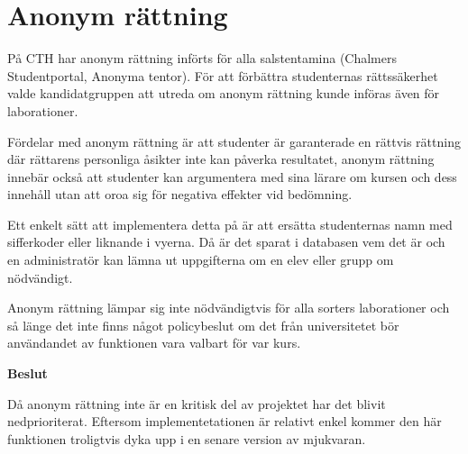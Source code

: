 \section{Anonym rättning}

På CTH har anonym rättning införts för alla salstentamina (Chalmers Studentportal, Anonyma tentor). För att förbättra studenternas rättssäkerhet valde kandidatgruppen att utreda om anonym rättning kunde införas även för laborationer.

Fördelar med anonym rättning är att studenter är garanterade en rättvis rättning där rättarens personliga åsikter inte kan påverka resultatet, anonym rättning innebär också att studenter kan argumentera med sina lärare om kursen och dess innehåll utan att oroa sig för negativa effekter vid bedömning.

Ett enkelt sätt att implementera detta på är att ersätta studenternas namn med sifferkoder eller liknande i vyerna. Då är det sparat i databasen vem det är och en administratör kan lämna ut uppgifterna om en elev eller grupp om nödvändigt.

Anonym rättning lämpar sig inte nödvändigtvis för alla sorters laborationer och så länge det inte finns något policybeslut om det från universitetet bör användandet av funktionen vara valbart för var kurs.

\begin{flushright}

  \textbf{Beslut}

  Då anonym rättning inte är en kritisk del av projektet har det blivit nedprioriterat.
Eftersom implementetationen är relativt enkel kommer den här funktionen troligtvis dyka upp i en senare version av mjukvaran.
\end{flushright}
